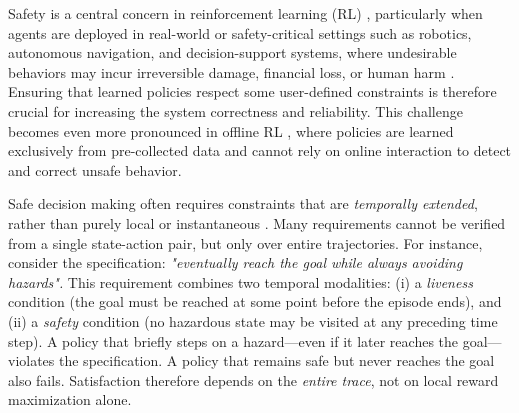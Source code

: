 Safety is a central concern in reinforcement learning (RL) \cite{sutton1998reinforcement}, particularly when agents are deployed in real-world or safety-critical settings such as robotics, autonomous navigation, and decision-support systems, where undesirable behaviors may incur irreversible damage, financial loss, or human harm \cite{safe_rl_survey}. Ensuring that learned policies respect some user-defined constraints is therefore crucial for increasing the system correctness and reliability. This challenge becomes even more pronounced in offline RL \cite{offline_rl_survey}, where policies are learned exclusively from pre-collected data and cannot rely on online interaction to detect and correct unsafe behavior.

Safe decision making often requires constraints that are \emph{temporally extended}, rather than purely local or instantaneous \cite{prob_shielding_AAAI25}. Many requirements cannot be verified from a single state-action pair, but only over entire trajectories. For instance, consider the specification: \emph{"eventually reach the goal while always avoiding hazards".}
This requirement combines two temporal modalities: (i) a \emph{liveness} condition (the goal must be reached at some point before the episode ends), and (ii) a \emph{safety} condition (no hazardous state may be visited at any preceding time step). A policy that briefly steps on a hazard—even if it later reaches the goal—violates the specification. A policy that remains safe but never reaches the goal also fails. Satisfaction therefore depends on the \emph{entire trace}, not on local reward maximization alone.


